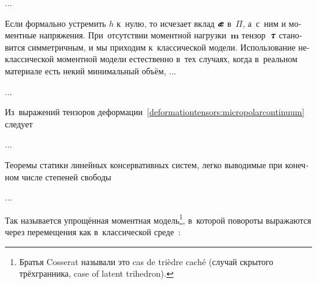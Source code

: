 \begin{otherlanguage}{russian}
...


Если формально устремить $h$ к~нулю, то исчезает вклад $\mathboldae$ в~$\Pi$, а~с~ним и моментные напряжения. При~отсутствии моментной нагрузки~$\bm{m}$ тензор~$\mathboldtau$ становится симметричным, и мы приходим к~классической модели. Использование неклассической моментной модели естественно в~тех случаях, когда в~реальном материале есть некий минимальный объём, ...

...



\label{para:compatibilityequations.cosseratcontinuum}

Из~выражений тензоров деформации~\eqref{deformationtensors:micropolarcontinuum} следует

...





Теоремы статики линейных консервативных систем, легко выводимые при конечном числе степеней свободы

...





\label{para:caseoflatenttrihedron.smalldisplacementsandrotations}

Так называется упрощённая моментная модель\footnote{Братья Cosserat называли это cas de trièdre caché (случай скрытого трёхгранника, case of latent trihedron).}\hspace{-0.32em},\hspace{0.24em} в~которой повороты выражаются через перемещения как в~классической среде~\cite{nowacki-elasticity}:


\end{otherlanguage}
